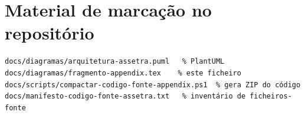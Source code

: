 %

\section*{Material de marcação no repositório}
\begin{verbatim}
docs/diagramas/arquitetura-assetra.puml   % PlantUML
docs/diagramas/fragmento-appendix.tex    % este ficheiro
docs/scripts/compactar-codigo-fonte-appendix.ps1  % gera ZIP do código
docs/manifesto-codigo-fonte-assetra.txt   % inventário de ficheiros-fonte
\end{verbatim}
